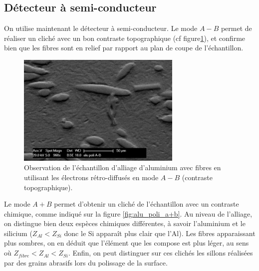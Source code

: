 \documentclass[a4paper,12pt]{article}
\begin{document}
\subsection{Détecteur à semi-conducteur}

On utilise maintenant le détecteur à semi-conducteur.
Le mode $A-B$ permet de réaliser un cliché avec un bon contraste topographique (cf figure\ref{fig:alu_poli_a-b}), et confirme bien que les fibres sont en relief par rapport au plan de coupe de l'échantillon.

\begin{figure}
\centering
\includegraphics[width=0.7\textwidth]{images/alu_er_amb.png}
\caption{Observation de l'échantillon d'alliage d'aluminium avec fibres en utilisant les électrons rétro-diffusés en mode $A-B$ (contraste topographique).}
\label{fig:alu_poli_a-b}
\end{figure}

Le mode $A+B$ permet d'obtenir un cliché de l'échantillon avec un contraste chimique, comme indiqué sur la figure \ref{fig:alu_poli_a+b}.
Au niveau de l'alliage, on distingue bien deux espèces chimiques différentes, à savoir l'aluminium et le silicium ($Z_{Al}<Z_{Si}$ donc le Si apparaît plus clair que l'Al).
Les fibres apparaissant plus sombres, on en déduit que l'élément que les compose est plus léger, au sens où $Z_{fibre}<Z_{Al}<Z_{Si}$.
Enfin, on peut distinguer sur ces clichés les sillons réalisées par des grains abrasifs lors du polissage de la surface.
\end{document}
